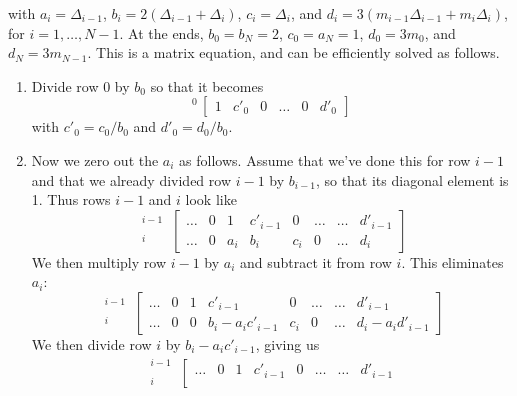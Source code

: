 with $a_{i} = \Delta_{i-1}$, $b_{i} = 2(\Delta_{i-1}+\Delta_{i})$, $c_{i} = \Delta_{i}$, and $d_{i} = 3(m_{i-1}\Delta_{i-1}+m_{i}\Delta_{i})$, for $i=1,\ldots,N-1$. At the ends, $b_{0}=b_{N}=2$, $c_{0}=a_{N}=1$, $d_{0}=3m_{0}$, and $d_{N}=3m_{N-1}$.
This is a  matrix equation, and can be efficiently solved as follows\cite{Press2007Numerical-Recip}.

\begin{enumerate}
\item Divide row 0 by $b_{0}$ so that it becomes
\[
{}^{0}\,\left[\begin{array}{ccccc|c}
  1 & c'_{0} & 0& \ldots & 0 & d'_{0} \end{array}\right]
\]
with $c'_{0} = c_{0}/b_{0}$ and $d'_{0} = d_{0}/b_{0}$.
\item Now we zero out the $a_{i}$ as follows. Assume that we've done this for row $i-1$ and that we already divided row $i-1$ by $b_{i-1}$, so that its diagonal element is 1. Thus rows $i-1$ and $i$ look like
\[
\begin{array}{r} {}^{i-1}\\ {}^{i}\end{array}\,
\left[\begin{array}{ccccccc|c}
	 \ldots & 0 & 1     & c'_{i-1} & 0     & \ldots & \ldots & d'_{i-1}\\
	 \ldots & 0 & a_{i} & b_{i}    & c_{i} & 0      & \ldots & d_{i}
\end{array}\right]
\]
We then multiply row $i-1$ by $a_{i}$ and subtract it from row $i$. This eliminates $a_{i}$:
\[
\begin{array}{r} {}^{i-1}\\ {}^{i}\end{array}\,
\left[\begin{array}{ccccccc|c}
	 \ldots & 0 & 1 & c'_{i-1}            & 0     & \ldots & \ldots & d'_{i-1}\\
	 \ldots & 0 & 0 & b_{i}-a_{i}c'_{i-1} & c_{i} & 0      & \ldots & d_{i}-a_{i}d'_{i-1}
\end{array}\right]
\]
We then divide row $i$ by $b_{i}-a_{i}c'_{i-1}$, giving us
\[
\begin{array}{r} {}^{i-1}\\ {}^{i}\end{array}\,
\left[\begin{array}{ccccccc|c}
	 \ldots & 0 & 1 & c'_{i-1} & 0      & \ldots & \ldots & d'_{i-1}\\

\end{array}\]
\end{enumerate}
